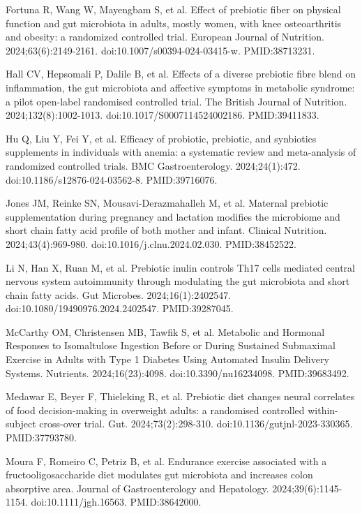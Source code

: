 \documentclass[12pt,oneside]{book}
\newcommand{\reff}[2]{\par\hangindent=7mm\hangafter=1\noindent[#1]\hspace{2mm}#2\par}
\begin{document}
\reff{26}{Fortuna R, Wang W, Mayengbam S, et al. Effect of prebiotic fiber on physical function and gut microbiota in adults, mostly women, with knee osteoarthritis and obesity: a randomized controlled trial. European Journal of Nutrition. 2024;63(6):2149-2161. doi:10.1007/s00394-024-03415-w. PMID:38713231.}

\reff{27}{Hall CV, Hepsomali P, Dalile B, et al. Effects of a diverse prebiotic fibre blend on inflammation, the gut microbiota and affective symptoms in metabolic syndrome: a pilot open-label randomised controlled trial. The British Journal of Nutrition. 2024;132(8):1002-1013. doi:10.1017/S0007114524002186. PMID:39411833.}

\reff{28}{Hu Q, Liu Y, Fei Y, et al. Efficacy of probiotic, prebiotic, and synbiotics supplements in individuals with anemia: a systematic review and meta-analysis of randomized controlled trials. BMC Gastroenterology. 2024;24(1):472. doi:10.1186/s12876-024-03562-8. PMID:39716076.}

\reff{29}{Jones JM, Reinke SN, Mousavi-Derazmahalleh M, et al. Maternal prebiotic supplementation during pregnancy and lactation modifies the microbiome and short chain fatty acid profile of both mother and infant. Clinical Nutrition. 2024;43(4):969-980. doi:10.1016/j.clnu.2024.02.030. PMID:38452522.}

\reff{30}{Li N, Han X, Ruan M, et al. Prebiotic inulin controls Th17 cells mediated central nervous system autoimmunity through modulating the gut microbiota and short chain fatty acids. Gut Microbes. 2024;16(1):2402547. doi:10.1080/19490976.2024.2402547. PMID:39287045.}

\reff{31}{McCarthy OM, Christensen MB, Tawfik S, et al. Metabolic and Hormonal Responses to Isomaltulose Ingestion Before or During Sustained Submaximal Exercise in Adults with Type 1 Diabetes Using Automated Insulin Delivery Systems. Nutrients. 2024;16(23):4098. doi:10.3390/nu16234098. PMID:39683492.}

\reff{32}{Medawar E, Beyer F, Thieleking R, et al. Prebiotic diet changes neural correlates of food decision-making in overweight adults: a randomised controlled within-subject cross-over trial. Gut. 2024;73(2):298-310. doi:10.1136/gutjnl-2023-330365. PMID:37793780.}

\reff{33}{Moura F, Romeiro C, Petriz B, et al. Endurance exercise associated with a fructooligosaccharide diet modulates gut microbiota and increases colon absorptive area. Journal of Gastroenterology and Hepatology. 2024;39(6):1145-1154. doi:10.1111/jgh.16563. PMID:38642000.}
\end{document}
